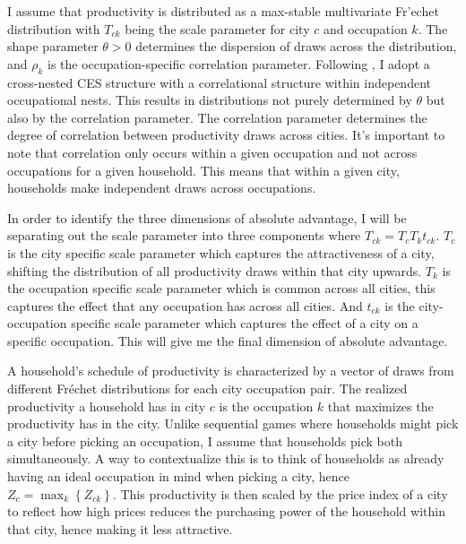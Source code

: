 \documentclass[10pt]{article}
\begin{document}
I assume that productivity is distributed as a max-stable multivariate Fr'{e}chet distribution with $T_{ck}$ being the scale parameter for city $c$ and occupation $k$. The shape parameter $\theta > 0$ determines the dispersion of draws across the distribution, and $\rho_k$ is the occupation-specific correlation parameter. Following \cite{lindandramondo}, I adopt a cross-nested CES structure with a correlational structure within independent occupational nests. This results in distributions not purely determined by $\theta$ but also by the correlation parameter. The correlation parameter determines the degree of correlation between productivity draws across cities. It's important to note that correlation only occurs within a given occupation and not across occupations for a given household. This means that within a given city, households make independent draws across occupations.

In order to identify the three dimensions of absolute advantage, I will be separating out the scale parameter into three components where $T_{ck} = T_c T_k t_{ck}$. $T_c$ is the city specific scale parameter which captures the attractiveness of a city, shifting the distribution of all productivity draws within that city upwards. $T_k$ is the occupation specific scale parameter which is common across all cities, this captures the effect that any occupation has across all cities. And $t_{ck}$ is the city-occupation specific scale parameter which captures the effect of a city on a specific occupation. This will give me the final dimension of absolute advantage.


A household's schedule of productivity is characterized by a vector of draws from different Fr\'{e}chet distributions for each city occupation pair. The realized productivity a household has in city $c$ is the occupation $k$ that maximizes the productivity has in the city. Unlike sequential games where households might pick a city before picking an occupation, I assume that households pick both simultaneously. A way to contextualize this is to think of households as already having an ideal occupation in mind when picking a city, hence $Z_c = \max_k \left\{ Z_{ck} \right\}$. This productivity is then scaled by the price index of a city to reflect how high prices reduces the purchasing power of the household within that city, hence making it less attractive.
\end{document}
